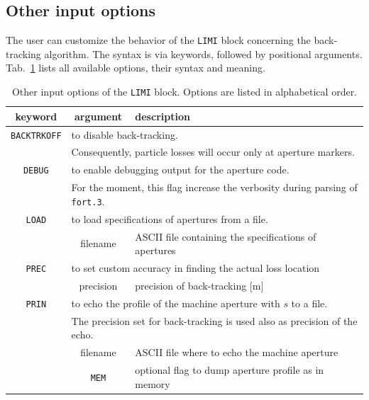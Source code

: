 \bigskip
\subsection{Other input options}\label{ApeLim:inpOptions}
The user can customize the behavior of the \texttt{LIMI} block concerning the back-tracking
algorithm. The syntax is via keywords, followed by positional arguments.
Tab.~\ref{tab:apeInpOptions} lists all available options, their syntax and meaning.

\begin{center}
\begin{longtable}{|c|c|l|}%
    \caption{Other input options of the \texttt{LIMI} block. Options are listed in alphabetical order.}
    \label{tab:apeInpOptions} \\*
    \hline
    \rowcolor{blue!30}
    keyword & argument & description \\*
    \hline
    \endfirsthead

    \texttt{BACKTRKOFF} & \multicolumn{2}{l|}{to disable back-tracking.} \\*
                        & \multicolumn{2}{l|}{Consequently, particle losses will occur only at aperture markers.} \\*
    \hline

    \texttt{DEBUG} & \multicolumn{2}{l|}{to enable debugging output for the aperture code.} \\*
                   & \multicolumn{2}{l|}{For the moment, this flag increase the verbosity during parsing of \texttt{fort.3}.} \\*
    \hline

    \texttt{LOAD}  & \multicolumn{2}{l|}{to load specifications of apertures from a file.} \\*
                   & filename & ASCII file containing the specifications of apertures \\*
    \hline

    \texttt{PREC}  & \multicolumn{2}{l|}{to set custom accuracy in finding the actual loss location} \\*
                   & precision & precision of back-tracking [m] \\*
    \hline

    \texttt{PRIN}  & \multicolumn{2}{l|}{to echo the profile of the machine aperture with $s$ to a file.} \\*
                   & \multicolumn{2}{l|}{The precision set for back-tracking is used also as precision of the echo.} \\*
                   & filename & ASCII file where to echo the machine aperture \\*
                   & \texttt{MEM} & optional flag to dump aperture profile as in memory \\*
    \hline


\end{longtable}
\end{center}
